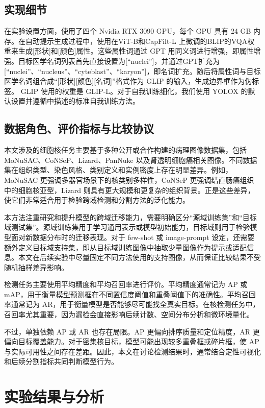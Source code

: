 \subsection{实现细节}
在实验设置方面，使用了四个 Nvidia RTX 3090 GPU，每个 GPU 具有 24 GB 内存。在自动提示生成过程中，使用在ViT-B和CapFilt-L \cite{li2022blip}上微调的BLIP的VQA权重来生成[形状]和[颜色]属性。这些属性词通过 GPT \cite{radford2019language} 用同义词进行增强，即属性增强。目标医学名词列表首先直接设置为[“nuclei”]，并通过GPT扩充为[“nuclei”、“nucleus”、“cyteblast”、“karyon”]，即名词扩充。随后将属性词与目标医学名词组合成“[形状][颜色][名词]”格式作为 GLIP 的输入，生成边界框作为伪标签。 GLIP 使用的权重是 GLIP-L。对于自我训练细化，我们使用 YOLOX 的默认设置并遵循\cite{dopido2013semisupervised}中描述的标准自我训练方法。



\subsection{数据角色、评价指标与比较协议}
本文涉及的细胞核任务主要基于多种公开或合作构建的病理图像数据集，包括 MoNuSAC、CoNSeP、Lizard、PanNuke 以及肾透明细胞癌相关图像。不同数据集在组织类型、染色风格、类别定义和实例密度上存在明显差异。例如，MoNuSAC 更强调多器官场景下的核类别多样性，CoNSeP 更强调结直肠癌组织中的细胞核亚型，Lizard 则具有更大规模和更复杂的组织背景。正是这些差异，使它们非常适合用于检验跨域检测和分割方法的泛化能力。

本方法注重研究和提升模型的跨域迁移能力，需要明确区分“源域训练集”和“目标域测试集”。源域训练集用于学习通用表示或模型初始能力，目标域则用于检验模型面对新数据分布时的迁移表现。对于 few-shot 或 image-prompt 设定，还需要额外定义目标域支持集，即从目标域训练图像中抽取少量图像作为提示或适配信息。本文在后续实验中尽量固定不同方法使用的支持图像，从而保证比较结果不受随机抽样差异影响。

检测任务主要使用平均精度和平均召回率进行评价。平均精度通常记为 AP 或 mAP，用于衡量模型预测框在不同置信度阈值和重叠阈值下的准确性。平均召回率通常记为 AR，用于衡量模型是否能够尽可能找全真实目标。在核检测任务中，召回率尤其重要，因为漏检会直接影响后续计数、空间分布分析和微环境量化。

不过，单独依赖 AP 或 AR 也存在局限。AP 更偏向排序质量和定位精度，AR 更偏向目标覆盖能力。对于密集核目标，模型可能出现较多重叠框或碎片框，使 AP 与实际可用性之间存在差距。因此，本文在讨论检测结果时，通常结合定性可视化和后续分割指标共同判断模型行为。

\section{实验结果与分析}
